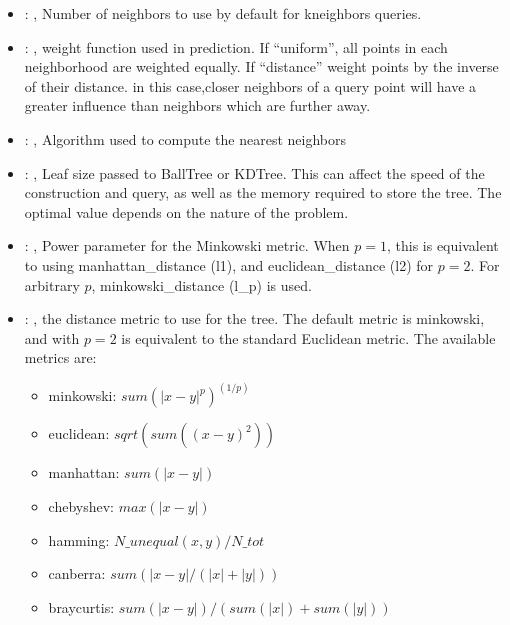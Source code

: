 \begin{itemize}
    \item {}: , 
      Number of neighbors to use by default for kneighbors queries.

    \item {}: , 
      weight function used in prediction. If ``uniform'', all points in each neighborhood
      are weighted equally. If ``distance'' weight points by the inverse of their distance. in this
      case,closer neighbors of a query point will have a greater influence than neighbors which are
      further away.

    \item {}: , 
      Algorithm used to compute the nearest neighbors

    \item {}: , 
      Leaf size passed to BallTree or KDTree. This can affect the speed of the construction
      and query, as well as the memory required to store the tree. The optimal value depends on the
      nature of the problem.

    \item {}: , 
      Power parameter for the Minkowski metric. When $p = 1$, this is equivalent to using
      manhattan\_distance (l1), and euclidean\_distance (l2) for $p = 2$. For arbitrary $p$,
      minkowski\_distance                                                  (l\_p) is used.

    \item {}: , 
      the distance metric to use for the tree. The default metric is minkowski, and with
      $p=2$ is equivalent to the standard Euclidean metric.
      The available metrics are:                                                  \begin{itemize}
      \item minkowski: $sum(|x - y|^p)^(1/p)$
      \item euclidean: $sqrt(sum((x - y)^2))$
      \item manhattan: $sum(|x - y|)$                                                    \item
      chebyshev: $max(|x - y|)$                                                    \item hamming:
      $N\_unequal(x, y) / N\_tot$                                                    \item canberra:
      $sum(|x - y| / (|x| + |y|))$                                                    \item
      braycurtis: $sum(|x - y|) / (sum(|x|) + sum(|y|))$
      \end{itemize}
  \end{itemize}



